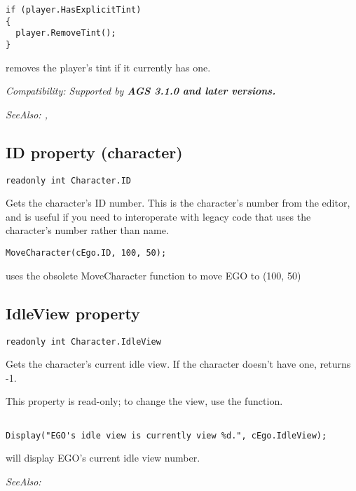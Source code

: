 \begin{verbatim}
if (player.HasExplicitTint)
{
  player.RemoveTint();
}
\end{verbatim}
removes the player's tint if it currently has one.

\it{Compatibility:} Supported by \bf{AGS 3.1.0} and later versions.

\it{SeeAlso:} ,


\subsection{ID property (character)}\label{Character.ID}%

\begin{verbatim}
readonly int Character.ID
\end{verbatim}
Gets the character's ID number. This is the character's number from the editor, and is
useful if you need to interoperate with legacy code that uses the character's number
rather than name.

\begin{verbatim}
MoveCharacter(cEgo.ID, 100, 50);
\end{verbatim}
uses the obsolete MoveCharacter function to move EGO to (100, 50)


\subsection{IdleView property}\label{Character.IdleView}%

\begin{verbatim}
readonly int Character.IdleView
\end{verbatim}
Gets the character's current idle view. If the character doesn't have one, returns -1.

This property is read-only; to change the view, use the 
function.

\begin{verbatim}

Display("EGO's idle view is currently view %d.", cEgo.IdleView);
\end{verbatim}
will display EGO's current idle view number.

\it{SeeAlso:} 



